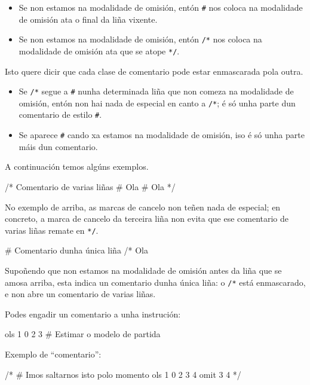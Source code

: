 \begin{itemize}
\item Se non estamos na modalidade de omisión, entón \texttt{\#} nos coloca
  na modalidade de omisión ata o final da liña vixente.
\item Se non estamos na modalidade de omisión, entón \texttt{/*} nos coloca
  na modalidade de omisión ata que se atope \texttt{*/}.
\end{itemize}

Isto quere dicir que cada clase de comentario pode estar enmascarada pola outra.

\begin{itemize}
\item Se \texttt{/*} segue a \texttt{\#} nunha determinada liña que non
  comeza na modalidade de omisión, entón non hai nada de especial en canto
  a \texttt{/*}; é só unha parte dun comentario de estilo \texttt{\#}.
\item Se aparece \texttt{\#} cando xa estamos na modalidade de omisión,
  iso é só unha parte máis dun comentario.
\end{itemize}

A continuación temos algúns exemplos.
%
\begin{code}
/* Comentario de varias liñas
   # Ola
   # Ola */
\end{code}
%
No exemplo de arriba, as marcas de cancelo non teñen nada de especial; en
concreto, a marca de cancelo da terceira liña non evita que ese comentario
de varias liñas remate en \texttt{*/}.
%
\begin{code}
# Comentario dunha única liña /* Ola
\end{code}
%
Supoñendo que non estamos na modalidade de omisión antes da liña que se amosa
arriba, esta indica un comentario dunha única liña: o \texttt{/*} está
enmascarado, e non abre un comentario de varias liñas.

Podes engadir un comentario a unha instrución:
%
\begin{code}
ols 1 0 2 3 # Estimar o modelo de partida
\end{code}
%
Exemplo de ``comentario'':
%
\begin{code}
/*
# Imos saltarnos isto polo momento
ols 1 0 2 3 4
omit 3 4
*/
\end{code}
%
